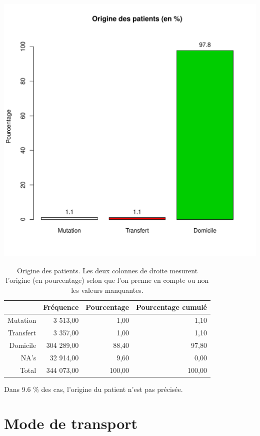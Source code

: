 \documentclass[12pt,english,french,twoside]{book}\usepackage[]{graphicx}\usepackage[]{color}
\makeatletter
\def\maxwidth{ %
  \ifdim\Gin@nat@width>\linewidth
    \linewidth
  \else
    \Gin@nat@width
  \fi
}
\makeatother
\begin{document}
\includegraphics[width=\maxwidth]{figure/mode_entree} 
\begin{table}[ht]
\centering
\begin{tabular}{rrrr}
  \hline
 & Fréquence & Pourcentage & Pourcentage cumulé \\ 
  \hline
Mutation & 3 513,00 & 1,00 & 1,10 \\ 
  Transfert & 3 357,00 & 1,00 & 1,10 \\ 
  Domicile & 304 289,00 & 88,40 & 97,80 \\ 
  NA's & 32 914,00 & 9,60 & 0,00 \\ 
    Total & 344 073,00 & 100,00 & 100,00 \\ 
   \hline
\end{tabular}
\caption[Origine des patients]{Origine des patients. Les deux colonnes de droite mesurent l'origine (en pourcentage) selon que l'on prenne en compte ou non les valeurs manquantes. } 
\label{origine}
\end{table}



Dans 9.6 \% des cas, l'origine du patient n'est pas précisée.

\section*{Mode de transport}
\end{document}
